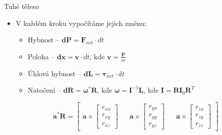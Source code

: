 \documentclass[aspectratio=169,xcolor=dvipsnames]{beamer}
\begin{document}
\begin{frame}{Tuhé těleso}
  \begin{itemize}
    \item V každém kroku vypočítáme jejich změnu:
      \begin{itemize}
        \item Hybnost -- $\mathbf{dP} = \mathbf{F}_{net} \cdot dt$
        \item Poloha -- $\mathbf{dx} = \mathbf{v} \cdot dt$, kde $\mathbf{v} =
          \frac{\mathbf{P}}{m}$
          \vspace{0.5cm}
        \item Úhlová hybnost -- $\mathbf{dL} = \mathbf{\tau}_{net} \cdot dt$
        \item Natočení -- $\mathbf{dR} = \mathbf{\omega}^* \mathbf{R}$, kde
          $\mathbf{\omega} = \mathbf{I}^{-1} \mathbf{L}$, kde $\mathbf{I} =
          \mathbf{R} \mathbf{I}_0 \mathbf{R}^T$
      \end{itemize}
      \vspace{0.5cm}
      \begin{equation}
        \mathbf{a}^* \mathbf{R} =
        \begin{bmatrix}
          \mathbf{a} \times
          \begin{bmatrix} r_{xx} \\ r_{xy} \\ r_{xz}
          \end{bmatrix} &&
          \mathbf{a} \times
          \begin{bmatrix} r_{yx} \\ r_{yy} \\ r_{yz}
          \end{bmatrix} &&
          \mathbf{a} \times
          \begin{bmatrix} r_{zx} \\ r_{zy} \\ r_{zz}
          \end{bmatrix}
        \end{bmatrix}
      \end{equation}
      \vspace{0.5cm}
      \cite{witkin1997}
      \cite{blackedout01_rigid_body}
      \cite{kopcil_trejbalova}
  \end{itemize}
\end{frame}
\end{document}
